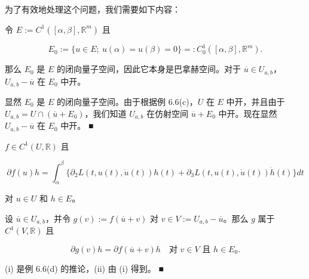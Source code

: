 为了有效地处理这个问题，我们需要如下内容：

\begin{lemma}

令 $ E := C^{1}([\alpha, \beta], \mathbb{R}^{m}) $ 且

\[
E_{0} := \{ u \in E ;\ u(\alpha) = u(\beta) = 0 \} =: C_{0}^{1}([\alpha, \beta], \mathbb{R}^{m}) .
\]

那么 $ E_{0} $ 是 $ E $ 的闭向量子空间，因此它本身是巴拿赫空间。对于 $ \overline{u} \in U_{a,b} $，$ U_{a,b} - \overline{u} $ 在 $ E_{0} $ 中开。

\proofhead
显然 $ E_{0} $ 是 $ E $ 的闭向量子空间。由于根据例 6.6(c)，$ U $ 在 $ E $ 中开，并且由于 $ U_{a,b} = U \cap (\overline{u} + E_{0}) $，我们知道 $ U_{a,b} $ 在仿射空间 $ \overline{u} + E_{0} $ 中开。现在显然 $ U_{a,b} - \overline{u} $ 在 $ E_{0} $ 中开。 \nobreak\hspace{0.35em}■
\end{lemma}

\begin{lemma}

\begin{subitems}
\item

$ f \in C^{1}(U, \mathbb{R}) $ 且

\[
\partial f(u)h = \int_{\alpha}^{\beta}\{\partial_{2}L(t, u(t), \dot{u}(t))h(t) + \partial_{3}L(t, u(t), \dot{u}(t))\dot{h}(t)\} dt
\]

对 $ u \in U $ 和 $ h \in E $。

\item

设 $ \overline{u} \in U_{a,b} $，并令 $ g(v) := f(\overline{u} + v) $ 对 $ v \in V := U_{a,b} - \overline{u} $。那么 $ g $ 属于 $ C^{1}(V, \mathbb{R}) $ 且

\begin{equation}
\partial g(v)h = \partial f(\overline{u} + v)h \quad \text{对 } v \in V \text{ 且 } h \in E_{0} .\tag{6.9}
\end{equation}

\proofhead
(i) 是例 6.6(d) 的推论，(ii) 由 (i) 得到。 \nobreak\hspace{0.35em}■
\end{subitems}

\end{lemma}

